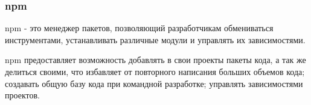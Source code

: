 \subsubsection{npm}

npm - это менеджер пакетов, позволяющий разработчикам обмениваться инструментами, устанавливать различные модули и управлять их зависимостями.

npm предоставляет возможность добавлять в свои проекты пакеты кода, а так же делиться своими, что избавляет от повторного написания больших объемов кода; создавать общую базу кода при командной разработке; управлять зависимостями проектов.